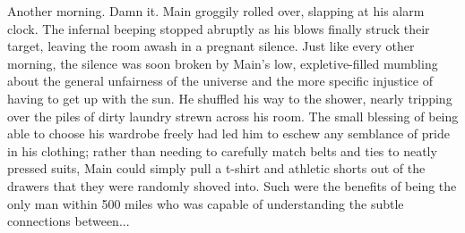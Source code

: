 Another morning.
Damn it.
Main groggily rolled over, slapping at his alarm clock. The infernal
beeping stopped abruptly as his blows finally struck their target,
leaving the room awash in a pregnant silence.  Just like every other
morning, the silence was soon broken by Main’s low, expletive-filled
mumbling about the general unfairness of the universe and the more
specific injustice of having to get up with the sun.
He shuffled his way to the shower, nearly tripping over the piles
of dirty laundry strewn across his room.  The small blessing of
being able to choose his wardrobe freely had led him to eschew
any semblance of pride in his clothing; rather than needing to
carefully match belts and ties to neatly pressed suits, Main
could simply pull a t-shirt and athletic shorts out of the
drawers that they were randomly shoved into. Such were the
benefits of being the only man within 500 miles who was capable
of understanding the subtle connections between... 
